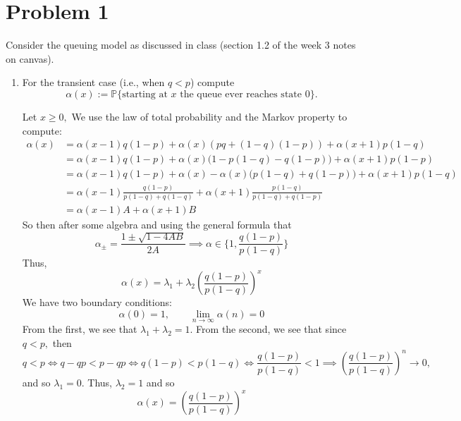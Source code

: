 \documentclass[11pt]{article}
\begin{document}
	
	
	\psetheader

\section*{Problem 1}
Consider the queuing model as discussed in class (section 1.2 of the week 3 notes on canvas).

\begin{enumerate}[label=(\alph*)]
    \item For the transient case (i.e., when \(q<p\)) compute
    \[
    \alpha(x):=\mathbb{P}\{\text{starting at $x$ the queue ever reaches state 0}\}.
    \]
\begin{solution}
    Let $x \geq 0,$ We use the law of total probability and the Markov property to compute:
\begin{align*}
    \alpha(x) &= \alpha(x-1) q(1-p) + \alpha(x)(pq + (1-q)(1-p)) + \alpha(x + 1)p(1-q)\\
    &= \alpha(x-1) q(1-p) + \alpha(x)\big(1 - p(1-q) - q(1-p)\big) + \alpha(x + 1)p(1-p)\\
    &= \alpha(x-1) q(1-p) + \alpha(x) - \alpha(x)\big(p(1-q) + q(1-p)\big) + \alpha(x + 1)p(1-q)\\
    &= \alpha(x-1) \frac{q(1-p)}{p(1-q) + q(1-q)} + \alpha(x + 1) \frac{p(1-q)}{p(1-q) + q(1-p)}\\
    &= \alpha(x-1)A + \alpha(x+1)B
\end{align*}
So then after some algebra and using the general formula that 
\[\alpha_{\pm} = \frac{1 \pm \sqrt{1 - 4AB}}{2A} \implies \alpha \in \{1, \frac{q(1-p)}{p(1-q)}\}\] Thus, 
\[\alpha(x) = \lambda_1  + \lambda_2\left(\frac{q(1-p)}{p(1-q)}\right)^x\]
We have two boundary conditions:
\[\alpha(0) = 1, \qquad \lim_{n \to \infty}\alpha(n) = 0\] From the first, we see that $\lambda_1 + \lambda_2 = 1.$ From the second, we see that since $q<p,$ then 
\[q< p \iff q - qp < p - qp \iff q(1-p) < p(1-q) \iff \frac{q(1-p)}{p(1-q)} <1 \implies \left(\frac{q(1-p)}{p(1-q)}\right)^n \to0,\] and so $\lambda_1 = 0.$ Thus, $\lambda_2 = 1$ and so 
\[\alpha(x) = \left(\frac{q(1-p)}{p(1-q)}\right)^x\]
\end{solution}
    

\end{enumerate}
\end{document}
